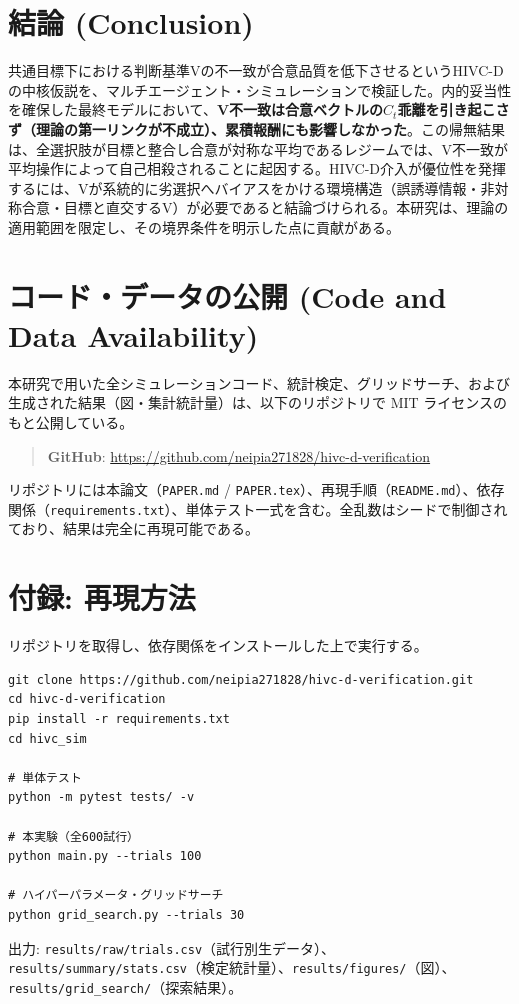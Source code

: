 \documentclass[11pt]{ltjsarticle}
\newcommand{\Ct}{\ensuremath{C_t}}
\begin{document}
\section{結論 (Conclusion)}

共通目標下における判断基準Vの不一致が合意品質を低下させるというHIVC-Dの中核仮説を、マルチエージェント・シミュレーションで検証した。内的妥当性を確保した最終モデルにおいて、\textbf{V不一致は合意ベクトルの\Ct{}乖離を引き起こさず（理論の第一リンクが不成立）、累積報酬にも影響しなかった}。この帰無結果は、全選択肢が目標と整合し合意が対称な平均であるレジームでは、V不一致が平均操作によって自己相殺されることに起因する。HIVC-D介入が優位性を発揮するには、Vが系統的に劣選択へバイアスをかける環境構造（誤誘導情報・非対称合意・目標と直交するV）が必要であると結論づけられる。本研究は、理論の適用範囲を限定し、その境界条件を明示した点に貢献がある。

\section*{コード・データの公開 (Code and Data Availability)}

本研究で用いた全シミュレーションコード、統計検定、グリッドサーチ、および生成された結果（図・集計統計量）は、以下のリポジトリで MIT ライセンスのもと公開している。

\begin{quote}
\textbf{GitHub}: \url{https://github.com/neipia271828/hivc-d-verification}
\end{quote}

リポジトリには本論文（\texttt{PAPER.md} / \texttt{PAPER.tex}）、再現手順（\texttt{README.md}）、依存関係（\texttt{requirements.txt}）、単体テスト一式を含む。全乱数はシードで制御されており、結果は完全に再現可能である。

\section*{付録: 再現方法}

リポジトリを取得し、依存関係をインストールした上で実行する。

\begin{Verbatim}[frame=single,fontsize=\small]
git clone https://github.com/neipia271828/hivc-d-verification.git
cd hivc-d-verification
pip install -r requirements.txt
cd hivc_sim

# 単体テスト
python -m pytest tests/ -v

# 本実験（全600試行）
python main.py --trials 100

# ハイパーパラメータ・グリッドサーチ
python grid_search.py --trials 30
\end{Verbatim}

出力: \texttt{results/raw/trials.csv}（試行別生データ）、\texttt{results/summary/stats.csv}（検定統計量）、\texttt{results/figures/}（図）、\texttt{results/grid\_search/}（探索結果）。
\end{document}
